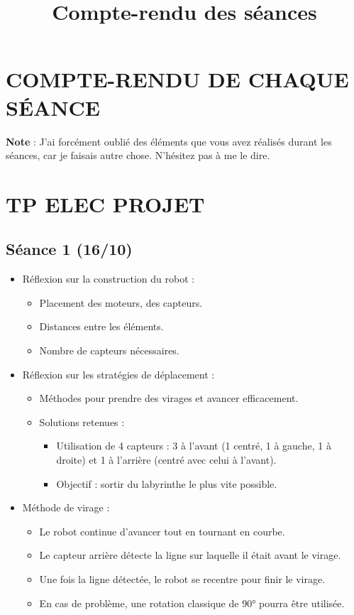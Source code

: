 \documentclass[a4paper,12pt]{article}
\begin{document}
\title{Compte-rendu des séances}
\author{}
\date{}
\maketitle

\section*{COMPTE-RENDU DE CHAQUE SÉANCE}

\textbf{Note} : J'ai forcément oublié des éléments que vous avez réalisés durant les séances, car je faisais autre chose. N'hésitez pas à me le dire.

\section{TP ELEC PROJET}

\subsection{Séance 1 (16/10)}
\begin{itemize}
    \item Réflexion sur la construction du robot :
    \begin{itemize}
        \item Placement des moteurs, des capteurs.
        \item Distances entre les éléments.
        \item Nombre de capteurs nécessaires.
    \end{itemize}
    \item Réflexion sur les stratégies de déplacement :
    \begin{itemize}
        \item Méthodes pour prendre des virages et avancer efficacement.
        \item Solutions retenues :
        \begin{itemize}
            \item Utilisation de 4 capteurs : 3 à l'avant (1 centré, 1 à gauche, 1 à droite) et 1 à l'arrière (centré avec celui à l'avant).
            \item Objectif : sortir du labyrinthe le plus vite possible.
        \end{itemize}
    \end{itemize}
    \item Méthode de virage :
    \begin{itemize}
        \item Le robot continue d'avancer tout en tournant en courbe.
        \item Le capteur arrière détecte la ligne sur laquelle il était avant le virage.
        \item Une fois la ligne détectée, le robot se recentre pour finir le virage.
        \item En cas de problème, une rotation classique de 90° pourra être utilisée.
    \end{itemize}
\end{itemize}
\end{document}
